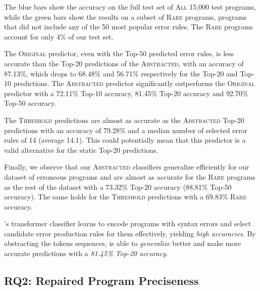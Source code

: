 The blue bars show the accuracy on the full test set of \textsc{All} 15,000 test
programs, while the green bars show the results on a subset of \textsc{Rare}
programs, \ie programs that did not include any of the 50 most popular error
rules. The \textsc{Rare} programs account for only 4\% of our test set.

The \textsc{Original} predictor, even with the Top-50 predicted error rules, is
less accurate than the Top-20 predictions of the \textsc{Abstracted}, with an
accuracy of 87.13\%, which drops to 68.48\% and 56.71\% respectively for the
Top-20 and Top-10 predictions. The \textsc{Abstracted} predictor significantly
outperforms the \textsc{Original} predictor with a 72.11\% Top-10 accuracy,
81.45\% Top-20 accuracy and 92.70\% Top-50 accuracy.

The \textsc{Threshold} predictions are almost as accurate as the
\textsc{Abstracted} Top-20 predictions with an accuracy of 79.28\% and a median
number of selected error rules of 14 (average 14.1). This could potentially mean
that this predictor is a valid alternative for the static Top-20 predictions.

Finally, we observe that our \textsc{Abstracted} classifiers generalize
efficiently for our dataset of erroneous \python programs and are almost as
accurate for the \textsc{Rare} programs as the rest of the dataset with a
73.32\% Top-20 accuracy (88.81\% Top-50 accuracy). The same holds for the
\textsc{Threshold} predictions with a 69.83\% \textsc{Rare} accuracy.

\begin{framed}
  \noindent \toolname's transformer classifier learns to encode programs with
  syntax errors and select candidate error production rules for them
  effectively, yielding \emph{high accuracies}. By abstracting the tokens
  sequences, \toolname is able to \emph{generalize} better and make more
  accurate predictions with a \emph{81.45\% Top-20 accuracy}.
\end{framed}


\subsection{RQ2: Repaired Program Preciseness}
\label{sec:eval:precise}


\iffalse

